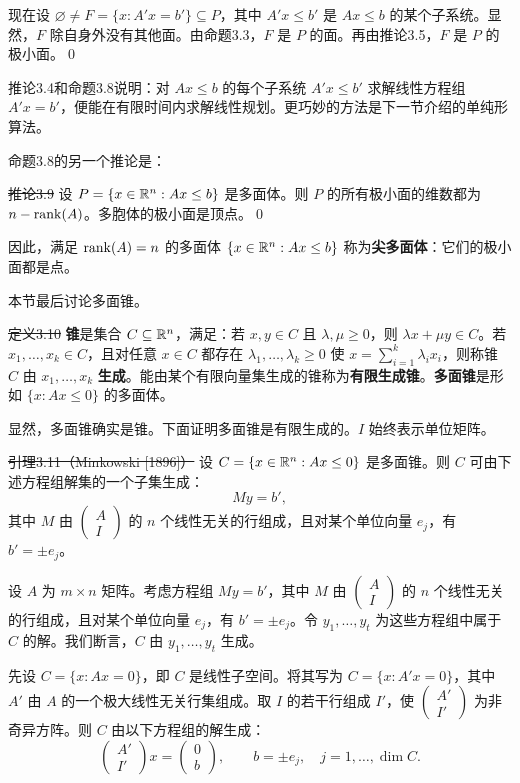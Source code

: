 现在设 $\varnothing\ne F=\{x:A'x=b'\}\subseteq P$，其中 $A'x\le b'$ 是 $Ax\le b$ 的某个子系统。显然，$F$ 除自身外没有其他面。由命题3.3，$F$ 是 $P$ 的面。再由推论3.5，$F$ 是 $P$ 的极小面。\qed

推论3.4和命题3.8说明：对 $Ax\le b$ 的每个子系统 $A'x\le b'$ 求解线性方程组 $A'x=b'$，便能在有限时间内求解线性规划。更巧妙的方法是下一节介绍的单纯形算法。

命题3.8的另一个推论是：

\st{推论3.9} 设 $P=\{x\in\mathbb R^n:Ax\le b\}$ 是多面体。则 $P$ 的所有极小面的维数都为 $n-\operatorname{rank}(A)$。多胞体的极小面是顶点。\qed

因此，满足 $\operatorname{rank}(A)=n$ 的多面体 $\{x\in\mathbb R^n:Ax\le b\}$ 称为\textbf{尖多面体}：它们的极小面都是点。

本节最后讨论多面锥。

\st{定义3.10} \textbf{锥}是集合 $C\subseteq\mathbb R^n$，满足：若 $x,y\in C$ 且 $\lambda,\mu\ge0$，则 $\lambda x+\mu y\in C$。若 $x_1,\ldots,x_k\in C$，且对任意 $x\in C$ 都存在 $\lambda_1,\ldots,\lambda_k\ge0$ 使 $x=\sum_{i=1}^k\lambda_i x_i$，则称锥 $C$ 由 $x_1,\ldots,x_k$ \textbf{生成}。能由某个有限向量集生成的锥称为\textbf{有限生成锥}。\textbf{多面锥}是形如 $\{x:Ax\le0\}$ 的多面体。

显然，多面锥确实是锥。下面证明多面锥是有限生成的。$I$ 始终表示单位矩阵。

\st{引理3.11（Minkowski [1896]）} 设 $C=\{x\in\mathbb R^n:Ax\le0\}$ 是多面锥。则 $C$ 可由下述方程组解集的一个子集生成：
\[
My=b',
\]
其中 $M$ 由 $\begin{pmatrix}A\\I\end{pmatrix}$ 的 $n$ 个线性无关的行组成，且对某个单位向量 $e_j$，有 $b'=\pm e_j$。

\pr 设 $A$ 为 $m\times n$ 矩阵。考虑方程组 $My=b'$，其中 $M$ 由 $\begin{pmatrix}A\\I\end{pmatrix}$ 的 $n$ 个线性无关的行组成，且对某个单位向量 $e_j$，有 $b'=\pm e_j$。令 $y_1,\ldots,y_t$ 为这些方程组中属于 $C$ 的解。我们断言，$C$ 由 $y_1,\ldots,y_t$ 生成。

先设 $C=\{x:Ax=0\}$，即 $C$ 是线性子空间。将其写为 $C=\{x:A'x=0\}$，其中 $A'$ 由 $A$ 的一个极大线性无关行集组成。取 $I$ 的若干行组成 $I'$，使 $\begin{pmatrix}A'\\I'\end{pmatrix}$ 为非奇异方阵。则 $C$ 由以下方程组的解生成：
\[
\begin{pmatrix}A'\\I'\end{pmatrix}x=\begin{pmatrix}0\\b\end{pmatrix},
\qquad b=\pm e_j,\quad j=1,\ldots,\dim C.
\]

